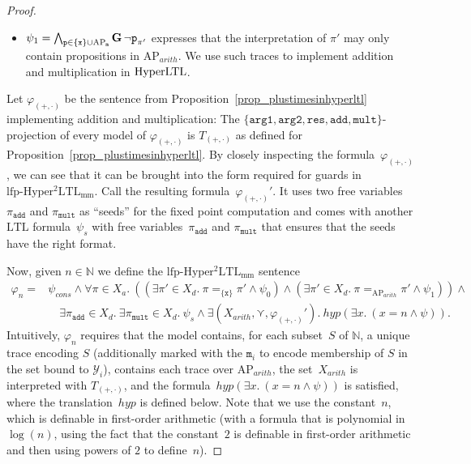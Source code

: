 \documentclass[dvipsnames,10pt,a4paper]{amsart}
\theoremstyle{definition}
\theoremstyle{remark}
\newcommand{\nats}{\mathbb{N}}
\renewcommand{\phi}{\varphi}
\newcommand{\set}[1]{\{#1\}}
\newcommand{\G}{\mathop{\mathbf{G}\vphantom{a}}\nolimits}
\newcommand{\ltl}{\mathrm{LTL}\xspace}
\newcommand{\hyltl}{\mathrm{Hyper\-LTL}\xspace}
\newcommand{\lfpsohyltlfp}{\mathrm{lfp\text{-}{Hyper^2LTL_{\mathrm{mm}}}}\xspace}
\newcommand{\ap}[0]{\mathrm{AP}}
\newcommand{\univar}{X_a}
\newcommand{\unidisvar}{X_d}
\newcommand{\smallest}{\curlyvee}
\newcommand{\myquot}[1]{``#1''}
\newcommand{\inprop}{\mathtt{x}}
\newcommand{\proposition}{\texttt{p}}
\newcommand{\argone}{\texttt{arg1}}
\newcommand{\argtwo}{\texttt{arg2}}
\newcommand{\res}{\texttt{res}}
\newcommand{\add}{\texttt{add}}
\newcommand{\mult}{\texttt{mult}}
\newcommand{\plustimes}{{(+,\cdot)}}
\newcommand{\hyperize}{{\mathit{hyp}}}
\newcommand{\arith}{\mathit{arith}}
\newcommand{\equals}[3]{#1 =_{#3} #2}
\newcommand{\marker}{\texttt{m}}
\newcommand{\consistent}{\mathit{cons}}
\begin{document}
\begin{proof}
\begin{itemize}
    As explained above, we use the markings to encode the membership of such sets in the $\mathcal{Y}_i$, thereby mimicking the existential quantification of the $\mathcal{Y}_i$.

    However, we need to ensure that this marking is done consistently, i.e., there is no trace~$t$ over $\set{\inprop}$ in the model that is both marked by $m_i$ and not marked by $m_i$. 
    This could happen, as these are just two different traces over $\ap$. 
    However, the formula
    \[
    \psi_\consistent = \forall \pi \in \unidisvar.\ \forall \pi' \in \unidisvar.\ \equals{\pi}{\pi'}{\set{x}} \rightarrow \equals{\pi}{\pi'}{\set{\inprop} \cup \ap_\marker}
    \]
    disallows this.
    
    \item $\psi_1 = \bigwedge_{\proposition \in \set{\inprop} \cup \ap_\marker}\G\neg\proposition_{\pi'}$ expresses that the interpretation of $\pi'$ may only contain propositions in $\ap_\arith$. We use such traces to implement addition and multiplication in $\hyltl$.
\end{itemize}
Let $\phi_\plustimes$ be the sentence from Proposition~\ref{prop_plustimesinhyperltl} implementing addition and multiplication: 
The $\set{\argone, \argtwo, \res, \add, \mult}$-projection of every model of $\phi_\plustimes$ is $T_\plustimes$ as defined for Proposition~\ref{prop_plustimesinhyperltl}. 
\label{pageref_plustimesaslfp} By closely inspecting the formula~$\phi_\plustimes$, we can see that it can be brought into the form required for guards in $\lfpsohyltlfp$. Call the resulting formula~$\phi_\plustimes'$. It uses two free variables~$\pi_\add$ and $\pi_\mult$ as \myquot{seeds} for the fixed point computation and comes with another $\ltl$ formula~$\psi_s$ with free variables~$\pi_\add$ and $\pi_\mult$ that ensures that the seeds have the right format.

Now, given $n\in\nats$ we define the $\lfpsohyltlfp$ sentence
\begin{align*}
\phi_n = {}&{} \psi_\consistent \wedge \forall\pi \in\univar.\ \left(
(\exists \pi' \in \unidisvar.\ \equals{\pi}{\pi'}{\set{\inprop}} \wedge \psi_0) \wedge
(\exists \pi' \in \unidisvar.\ \equals{\pi}{\pi'}{\ap_\arith} \wedge \psi_1)\right)
\wedge \\
{}&{}\quad\exists \pi_\add \in \unidisvar.\ \exists \pi_\mult \in \unidisvar.\ \psi_s \wedge \exists(X_\arith, \smallest, \phi_\plustimes').\ \hyperize(\exists x.\ ( x = n \wedge \psi)).    
\end{align*}
Intuitively, $\phi_n$ requires that the model contains, for each subset~$S$ of $\nats$, a unique trace encoding $S$ (additionally marked with the $\marker_i$ to encode membership of $S$ in the set bound to $\mathcal{Y}_i$), contains each trace over $\ap_\arith$, the set~$X_\arith$ is interpreted with $T_\plustimes$, and the formula~$\hyperize(\exists x.\ ( x = n \wedge \psi))$ is satisfied, where the translation~$\hyperize$ is defined below.
Note that we use the constant~$n$, which is definable in first-order arithmetic (with a formula that is polynomial in $\log(n)$, using the fact that the constant~$2$ is definable in first-order arithmetic and then using powers of $2$ to define~$n$).


\end{proof}
\end{document}

